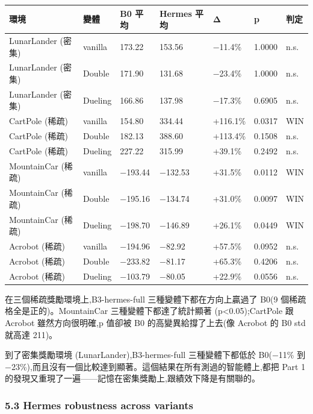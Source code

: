{\def\LTcaptype{none} %
\begin{longtable}[]{@{}lllllll@{}}
\toprule\noalign{}
環境 & 變體 & B0 平均 & Hermes 平均 & Δ & p & 判定 \\
\midrule\noalign{}
\endhead
\bottomrule\noalign{}
\endlastfoot
LunarLander (密集) & vanilla & 173.22 & 153.56 & −11.4\% & 1.0000 & n.s. \\
LunarLander (密集) & Double & 171.90 & 131.68 & −23.4\% & 1.0000 & n.s. \\
LunarLander (密集) & Dueling & 166.86 & 137.98 & −17.3\% & 0.6905 & n.s. \\
CartPole (稀疏) & vanilla & 154.80 & 334.44 & +116.1\% & 0.0317 & WIN \\
CartPole (稀疏) & Double & 182.13 & 388.60 & +113.4\% & 0.1508 & n.s. \\
CartPole (稀疏) & Dueling & 227.22 & 315.99 & +39.1\% & 0.2492 & n.s. \\
MountainCar (稀疏) & vanilla & −193.44 & −132.53 & +31.5\% & 0.0112 & WIN \\
MountainCar (稀疏) & Double & −195.16 & −134.74 & +31.0\% & 0.0097 & WIN \\
MountainCar (稀疏) & Dueling & −198.70 & −146.89 & +26.1\% & 0.0449 & WIN \\
Acrobot (稀疏) & vanilla & −194.96 & −82.92 & +57.5\% & 0.0952 & n.s. \\
Acrobot (稀疏) & Double & −233.82 & −81.17 & +65.3\% & 0.4206 & n.s. \\
Acrobot (稀疏) & Dueling & −103.79 & −80.05 & +22.9\% & 0.0556 & n.s. \\
\end{longtable}
}

在三個稀疏獎勵環境上,B3-hermes-full 三種變體下都在方向上贏過了 B0(9 個稀疏格全是正的)。MountainCar 三種變體下都達了統計顯著 (p\textless0.05);CartPole 跟 Acrobot 雖然方向很明確,p 值卻被 B0 的高變異給撐了上去(像 Acrobot 的 B0 std 就高達 211)。

到了密集獎勵環境 (LunarLander),B3-hermes-full 三種變體下都低於 B0(−11\% 到 −23\%),而且沒有一個比較達到顯著。這個結果在所有測過的智能體上,都把 Part 1 的發現又重現了一遍------記憶在密集獎勵上,跟績效下降是有關聯的。

\subsubsection{5.3 Hermes robustness across variants}\label{53-hermes-robustness-across-variants}

